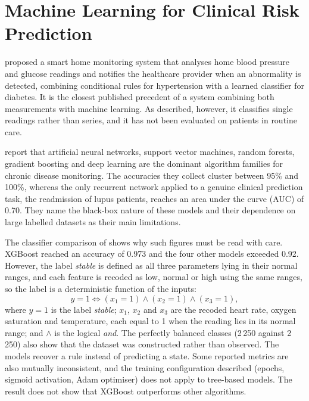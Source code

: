 \section{Machine Learning for Clinical Risk Prediction}\label{sec:lr-ml}

\Textcite{chatrati2022} proposed a smart home monitoring system that analyses home blood pressure and glucose readings and notifies the healthcare provider when an abnormality is detected, combining conditional rules for hypertension with a learned classifier for diabetes. It is the closest published precedent of a system combining both measurements with machine learning. As described, however, it classifies single readings rather than series, and it has not been evaluated on patients in routine care.

\Textcite{liu2025review} report that artificial neural networks, support vector machines, random forests, gradient boosting and deep learning are the dominant algorithm families for chronic disease monitoring. The accuracies they collect cluster between 95\% and 100\%, whereas the only recurrent network applied to a genuine clinical prediction task, the readmission of lupus patients, reaches an area under the curve (AUC) of 0.70. They name the black-box nature of these models and their dependence on large labelled datasets as their main limitations.

The classifier comparison of \textcite{efendi2025} shows why such figures must be read with care. XGBoost reached an accuracy of 0.973 and the four other models exceeded 0.92. However, the label \emph{stable} is defined as all three parameters lying in their normal ranges, and each feature is recoded as low, normal or high using the same ranges, so the label is a deterministic function of the inputs:
\begin{equation}
  y = 1 \iff (x_1 = 1) \wedge (x_2 = 1) \wedge (x_3 = 1),
\end{equation}
where $y = 1$ is the label \emph{stable}; $x_1$, $x_2$ and $x_3$ are the recoded heart rate, oxygen saturation and temperature, each equal to 1 when the reading lies in its normal range; and $\wedge$ is the logical \emph{and}. The perfectly balanced classes (2\,250 against 2\,250) also show that the dataset was constructed rather than observed. The models recover a rule instead of predicting a state. Some reported metrics are also mutually inconsistent, and the training configuration described (epochs, sigmoid activation, Adam optimiser) does not apply to tree-based models. The result does not show that XGBoost outperforms other algorithms.

